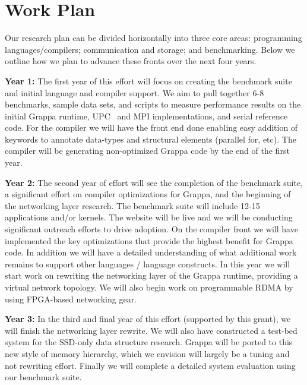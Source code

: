 \section{Work Plan}
\label{sec:plan}

Our research plan can be divided horizontally into three core areas: programming languages/compilers; communication and storage; and benchmarking. Below we outline how we plan to advance these fronts over the next four years.

\vspace{2ex}


\noindent\textbf{Year 1:} The first year of this effort will focus on creating the benchmark suite and initial language and compiler support.  We aim to pull together 6-8 benchmarks, sample data sets, and scripts to measure performance results on the initial Grappa runtime, UPC~\cite{upc:2005} and MPI implementations, and serial reference code.  For the compiler we will have the front end done enabling easy addition of keywords to annotate data-types and structural elements (parallel for, etc).  The compiler will be generating non-optimized Grappa code by the end of the first year.

\vspace{1ex}
\noindent\textbf{Year 2:} The second year of effort will see the completion of the benchmark suite, a significant effort on compiler optimizations for Grappa, and the beginning of the networking layer research.  The benchmark suite will include 12-15 applications and/or kernels.  The website will be live and we will be conducting significant outreach efforts to drive adoption.  On the compiler front we will have implemented the key optimizations that provide the highest benefit for Grappa code.  In addition we will have a detailed understanding of what additional work remains to support other languages / language constructs.  In this year we will start work on rewriting the networking layer of the Grappa runtime, providing a virtual network topology.  We will also begin work on programmable RDMA by using FPGA-based networking gear.


\vspace{1ex} 
\noindent\textbf{Year 3:} In the third and final year of this
effort (supported by this grant), we will finish the networking layer rewrite.
We will also have constructed a test-bed system for the SSD-only data
structure research. Grappa will be ported to this new style of memory
hierarchy, which we envision will largely be a tuning and not rewriting
effort. Finally we will complete a detailed system evaluation using our
benchmark suite.

